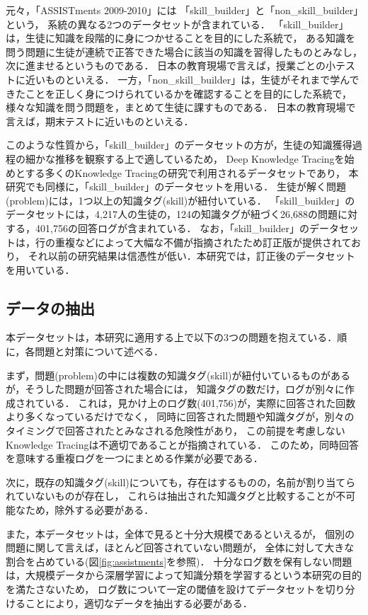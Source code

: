元々，「ASSISTments 2009-2010」には
「skill\_builder」と「non\_skill\_builder」という，
系統の異なる2つのデータセットが含まれている．
「skill\_builder」は，生徒に知識を段階的に身につかせることを目的にした系統で，
ある知識を問う問題に生徒が連続で正答できた場合に該当の知識を習得したものとみなし，次に進ませるというものである．
日本の教育現場で言えば，授業ごとの小テストに近いものといえる．
一方，「non\_skill\_builder」は，生徒がそれまで学んできたことを正しく身につけられているかを確認することを目的にした系統で，
様々な知識を問う問題を，まとめて生徒に課すものである．
日本の教育現場で言えば，期末テストに近いものといえる．

このような性質から，「skill\_builder」のデータセットの方が，生徒の知識獲得過程の細かな推移を観察する上で適しているため，
Deep Knowledge Tracing\cite{piech2015deep}を始めとする多くのKnowledge Tracingの研究で利用されるデータセットであり，
本研究でも同様に，「skill\_builder」のデータセットを用いる．
生徒が解く問題(problem)には，1つ以上の知識タグ(skill)が紐付いている．
「skill\_builder」のデータセットには，4,217人の生徒の，124の知識タグが紐づく26,688の問題に対する，401,756の回答ログが含まれている．
なお，「skill\_builder」のデータセットは，行の重複などによって大幅な不備が指摘されたため訂正版が提供されており，
それ以前の研究結果は信憑性が低い．本研究では，訂正後のデータセットを用いている．


\subsection{データの抽出}
本データセットは，本研究に適用する上で以下の3つの問題を抱えている．順に，各問題と対策について述べる．

まず，問題(problem)の中には複数の知識タグ(skill)が紐付いているものがあるが，そうした問題が回答された場合には，
知識タグの数だけ，ログが別々に作成されている．
これは，見かけ上のログ数(401,756)が，実際に回答された回数より多くなっているだけでなく，
同時に回答された問題や知識タグが，別々のタイミングで回答されたとみなされる危険性があり，
この前提を考慮しないKnowledge Tracingは不適切であることが指摘されている\cite{xiong2016going}．
このため，同時回答を意味する重複ログを一つにまとめる作業が必要である．

次に，既存の知識タグ(skill)についても，存在はするものの，名前が割り当てられていないものが存在し，
これらは抽出された知識タグと比較することが不可能なため，除外する必要がある．


また，本データセットは，全体で見ると十分大規模であるといえるが，
個別の問題に関して言えば，ほとんど回答されていない問題が，
全体に対して大きな割合を占めている(図\ref{fig:assistments}を参照)．
十分なログ数を保有しない問題は，大規模データから深層学習によって知識分類を学習するという本研究の目的を満たさないため，
ログ数について一定の閾値を設けてデータセットを切り分けることにより，適切なデータを抽出する必要がある．


